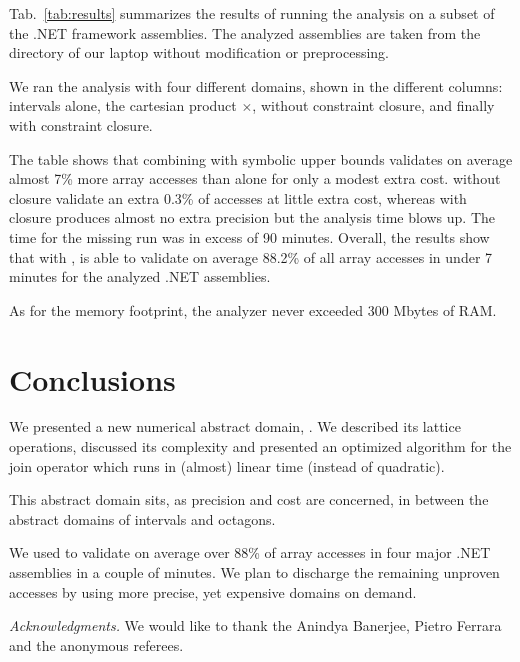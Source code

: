 \documentclass{sig-alternate}
\begin{document}
Tab.~\ref{tab:results} summarizes the results of running the analysis
on a subset of the .NET framework assemblies. 
 The analyzed assemblies
are taken from the directory   of 
our laptop without modification or preprocessing.

We ran the analysis with four different domains, shown in the
different columns: intervals alone, the cartesian product
\Intervals$\times$\SUB, \Pentagons{} without constraint closure, and
finally \Pentagons{} with constraint closure. 

The table shows that combining \Intervals{} with symbolic upper bounds
validates on average almost 7\% more array accesses than \Intervals{}
alone for only a modest extra cost. \Pentagons{} without closure
validate an extra 0.3\% of accesses at little extra cost, whereas
\Pentagons{} with closure produces almost no extra precision but the
analysis time blows up. The time for the missing run was in excess of
90 minutes. Overall, the results show that with \Pentagons{}, \Clousot{} is able to
validate on average 88.2\% of all array accesses in under 7
minutes for the analyzed .NET assemblies.

As for the memory footprint, the analyzer never exceeded 300 Mbytes of RAM.
\smallskip

\section{Conclusions}
We presented a new numerical abstract domain, \Pentagons.  We
described its lattice operations, discussed its complexity and
presented an optimized algorithm for the join operator which runs in
(almost) linear time (instead of quadratic).

This abstract domain sits, as precision and cost are concerned, in
between the abstract domains of intervals and octagons.

We used \Pentagons{} to validate on average over 88\% of array
accesses in four major .NET assemblies in a couple of minutes. We plan
to discharge the remaining unproven accesses by using more
precise, yet expensive domains on demand.

\textit{Acknowledgments.} We would like to thank the Anindya Banerjee, Pietro Ferrara and the anonymous referees.
\end{document}

